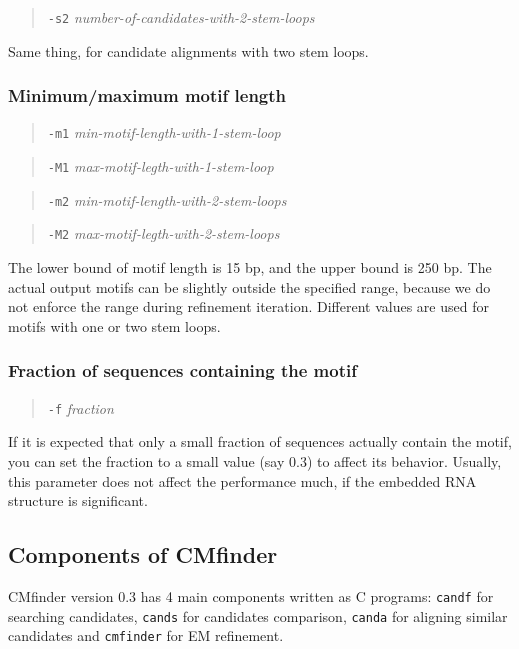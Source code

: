\documentclass[letterpaper,12pt]{report}
\begin{document}
\begin{quote}
{\tt -s2} {\it number-of-candidates-with-2-stem-loops}
\end{quote}
Same thing, for candidate alignments with two stem loops.

\subsubsection{Minimum/maximum motif length}

\begin{quote}
{\tt -m1} {\it min-motif-length-with-1-stem-loop}
\end{quote}
\begin{quote}
{\tt -M1} {\it max-motif-legth-with-1-stem-loop}
\end{quote}
\begin{quote}
{\tt -m2} {\it min-motif-length-with-2-stem-loops}
\end{quote}
\begin{quote}
{\tt -M2} {\it max-motif-legth-with-2-stem-loops}
\end{quote}

The lower bound of motif length is 15 bp, and the upper bound is 250 bp. 
The actual output motifs can be slightly outside the specified range, 
because we do not enforce the range during refinement iteration. 
Different values are used for motifs with one or two stem loops.

\subsubsection{Fraction of sequences containing the motif}

\begin{quote}
{\tt -f} {\it fraction}
\end{quote}

If it is expected that only a small fraction of sequences actually contain the motif, 
you can set the fraction to a small value (say 0.3) to affect its behavior. 
Usually, this parameter does not affect the performance much, if the embedded RNA structure is significant.

\subsection{Components of CMfinder}

CMfinder version 0.3 has 4 main components written as C programs: {\tt candf} for searching candidates, {\tt cands} for candidates comparison, {\tt canda}
for aligning similar candidates and {\tt cmfinder} for EM refinement. 
\end{document}
